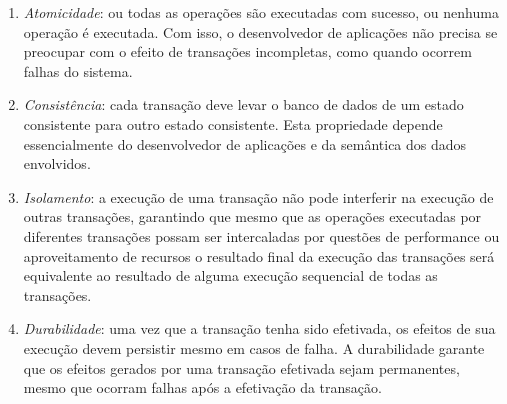 \documentclass[11pt,twoside,a4paper]{book}
\begin{document}
\begin{enumerate}
\item \emph{Atomicidade}: ou todas as operações são executadas com sucesso, ou nenhuma operação é executada. Com isso, o desenvolvedor de aplicações não precisa se preocupar com o efeito de transações incompletas, como quando ocorrem falhas do sistema. %
\item \emph{Consistência}: cada transação deve levar o banco de dados de um estado consistente para outro estado consistente. Esta propriedade depende essencialmente do desenvolvedor de aplicações e da semântica dos dados envolvidos. %
\item \emph{Isolamento}: a execução de uma transação não pode interferir na execução de outras transações, garantindo que mesmo que as operações executadas por diferentes transações possam ser intercaladas por questões de performance ou aproveitamento de recursos o resultado final da execução das transações será equivalente ao resultado de alguma execução sequencial de todas as transações.
\item \emph{Durabilidade}: uma vez que a transação tenha sido efetivada, os efeitos de sua execução devem persistir mesmo em casos de falha. A durabilidade garante que os efeitos gerados por uma transação efetivada sejam permanentes, mesmo que ocorram falhas após a efetivação da transação. %
\end{enumerate}

\end{document}
